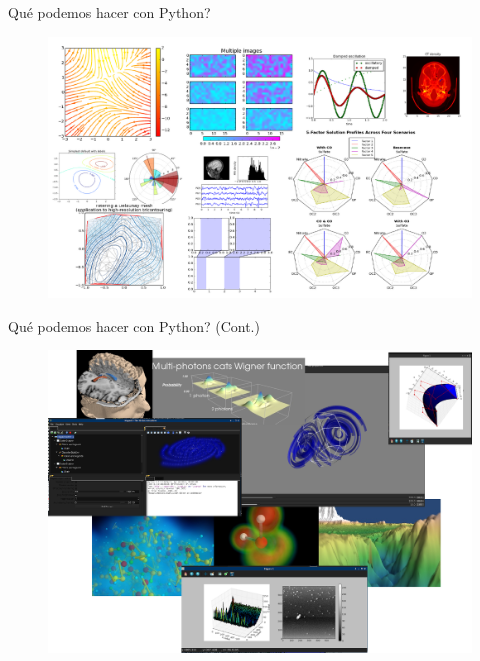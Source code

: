 \documentclass[xcolor=dvipsnames]{beamer}
\begin{document}
\begin{frame}{Qu\'e podemos hacer con Python?}
 \begin{figure}[h]
		\includegraphics[scale = 0.25]{Imagenes/quehacer5.png}
\end{figure}
\end{frame}

\begin{frame}{Qu\'e podemos hacer con Python? (Cont.)}

 \begin{figure}[h]
		\includegraphics[scale = 0.2]{Imagenes/quehacer2.png}
\end{figure}
\end{frame}
\end{document}
